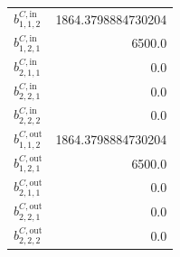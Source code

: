 \documentclass{article}%
\begin{document}
\begin{multicols*}{3}
\begin{supertabular}{lr}
	$b_{1,1,2}^{C,\text{in}}$ & 1864.3798884730204 \\%
	$b_{1,2,1}^{C,\text{in}}$ & 6500.0 \\%
	$b_{2,1,1}^{C,\text{in}}$ & 0.0 \\%
	$b_{2,2,1}^{C,\text{in}}$ & 0.0 \\%
	$b_{2,2,2}^{C,\text{in}}$ & 0.0 \\%
	$b_{1,1,2}^{C,\text{out}}$ & 1864.3798884730204 \\%
	$b_{1,2,1}^{C,\text{out}}$ & 6500.0 \\%
	$b_{2,1,1}^{C,\text{out}}$ & 0.0 \\%
	$b_{2,2,1}^{C,\text{out}}$ & 0.0 \\%
	$b_{2,2,2}^{C,\text{out}}$ & 0.0 \\%
\end{supertabular}%
\end{multicols*}%
\end{document}
